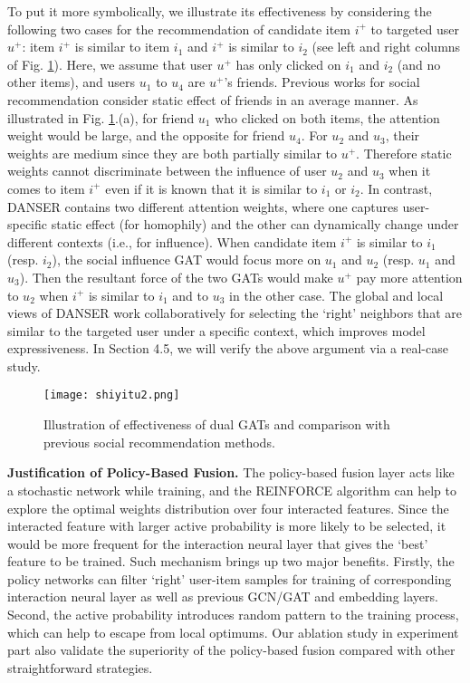 \documentclass[sigconf]{acmart}
\begin{document}
{
To put it more symbolically, we illustrate its effectiveness by  considering the following two cases for the recommendation of candidate item $i^+$ to targeted user $u^+$: item $i^+$ is similar to item $i_1$ and $i^+$ is similar to $i_2$ (see left and right columns of Fig. \ref{fig-shiyitu2}). 
Here, we assume that user $u^+$ has only clicked on $i_1$ and $i_2$ (and no other items), and 
users $u_1$ {to} $u_4$ are $u^+$'s friends. 
}
Previous works for social recommendation consider static effect of friends in an average manner. 
{As {illustrated} in Fig. \ref{fig-shiyitu2}.(a), for friend $u_1$ who {clicked on} both items, the attention weight would be large, and {the opposite} for friend $u_4$. 
For $u_2$ and $u_3$, their weights are medium since they are both partially similar to $u^+$. }
{Therefore} static weights cannot discriminate {between the} influence of user $u_2$ and $u_3$ when it comes to item {$i^+$ even if it is known that it is similar to $i_1$ or $i_2$}. 
{In} contrast, DANSER contains two different attention weights, where one captures user-specific static effect (for homophily) and the other can dynamically change under different contexts (i.e., for influence).
{When candidate item $i^+$ is similar to $i_1$ (resp. $i_2$), the social influence GAT would focus more on $u_1$ and $u_2$ (resp. $u_1$ and $u_3$).}
Then the resultant force of {the} two GATs would make $u^+$ pay more attention to $u_2$ {when $i^+$ is similar to $i_1$}
and to $u_3$ {in the other case.}
The global and local views of DANSER work collaboratively for selecting {the} `right' neighbors that are similar to {the} targeted user under a specific context, which improves model expressiveness. 
In Section 4.5, we will verify the above argument via a real-case study.

\begin{figure}[t]
\vspace{-5pt}
\setlength{\abovecaptionskip}{-0.1cm}
	\centering
	\texttt{[image: shiyitu2.png]}
	\vspace{2pt}
	\caption{Illustration of effectiveness of dual GATs and comparison with previous social recommendation methods.}
	\label{fig-shiyitu2}
	\vspace{-10pt}
\end{figure}

\textbf{Justification of Policy-Based Fusion.}
The policy-based fusion layer acts like a stochastic network while training, and the REINFORCE algorithm can help to explore the optimal weights distribution over four interacted features. Since the interacted feature with larger active probability is more likely to be selected, it would be more frequent for the interaction neural layer that gives the `best' feature to be trained. Such mechanism brings up two major benefits. Firstly, the policy networks can filter `right' user-item samples for training of corresponding interaction neural layer as well as previous GCN/GAT and embedding layers. Second, the active probability introduces random pattern to the training process, which can help to escape from local optimums. Our ablation study in experiment part also validate the superiority of the policy-based fusion compared with other straightforward strategies.
\end{document}
